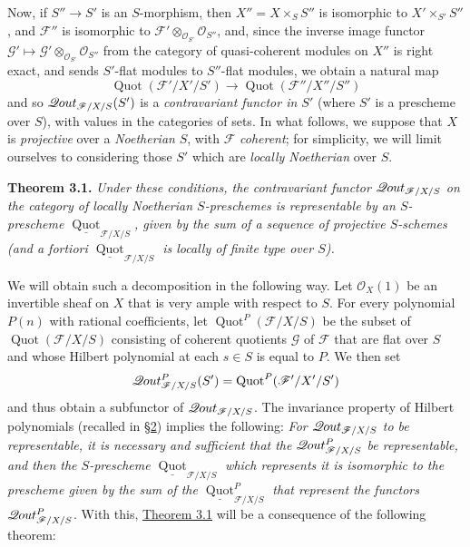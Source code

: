 \documentclass{article}
\newenvironment{itenv}[1]
  {\phantomsection\par\smallskip\noindent\textbf{#1.}\itshape}
  {\par\smallskip}
\theoremstyle{definition}
\theoremstyle{definition}
\theoremstyle{definition}
\theoremstyle{definition}
\theoremstyle{remark}
\begin{document}
Now, if \(S''\to S'\) is an \(S\)-morphism, then \(X''=X\times_S S''\) is isomorphic to \(X'\times_{S'}S''\), and \({\mathscr{F}}''\) is isomorphic to \({\mathscr{F}}'\otimes_{{\mathscr{O}}_{S'}}{\mathscr{O}}_{S''}\), and, since the inverse image functor \({\mathscr{G}}'\mapsto{\mathscr{G}}'\otimes_{{\mathscr{O}}_{S'}}{\mathscr{O}}_{S''}\) from the category of quasi-coherent modules on \(X''\) is right exact, and sends \(S'\)-flat modules to \(S''\)-flat modules, we obtain a natural map
\[
  \operatorname{Quot}({{\mathscr{F}}'/X'/S'}) \to \operatorname{Quot}({\mathscr{F}}''/X''/S'')
\]
and so \(\mathscr{Q}\kern -.5pt out_{{{\mathscr{F}}/X/S}}(S')\) is a \emph{contravariant functor in \(S'\)} (where \(S'\) is a prescheme over \(S\)), with values in the categories of sets.
In what follows, we suppose that \(X\) is \emph{projective} over a \emph{Noetherian} \(S\), with \({\mathscr{F}}\) \emph{coherent};
for simplicity, we will limit ourselves to considering those \(S'\) which are \emph{locally Noetherian} over \(S\).

\leavevmode{}%
\begin{itenv}{Theorem 3.1}
Under these conditions, the contravariant functor \(\mathscr{Q}\kern -.5pt out_{{{\mathscr{F}}/X/S}}\) on the category of locally Noetherian \(S\)-preschemes is \emph{representable} by an \(S\)-prescheme \(\underline{\operatorname{Quot}}_{{{\mathscr{F}}/X/S}}\), given by the sum of a sequence of projective \(S\)-schemes (and a fortiori \(\underline{\operatorname{Quot}}_{{{\mathscr{F}}/X/S}}\) is locally of finite type over \(S\)).

\end{itenv}

We will obtain such a decomposition in the following way.
Let \({\mathscr{O}}_X(1)\) be an invertible sheaf on \(X\) that is very ample with respect to \(S\).
For every polynomial \(P(n)\) with rational coefficients, let \(\operatorname{Quot}^P({{\mathscr{F}}/X/S})\) be the subset of \(\operatorname{Quot}({{\mathscr{F}}/X/S})\) consisting of coherent quotients \({\mathscr{G}}\) of \({\mathscr{F}}\) that are flat over \(S\) and whose Hilbert polynomial at each \(s\in S\) is equal to \(P\).
We then set
\[
  \mathscr{Q}\kern -.5pt out_{{\mathscr{F}}/X/S}^P(S') = \operatorname{Quot}^P({{\mathscr{F}}'/X'/S'})
\]
and thus obtain a subfunctor of \(\mathscr{Q}\kern -.5pt out_{{\mathscr{F}}/X/S}\).
The invariance property of Hilbert polynomials (recalled in \protect\hyperlink{fga-3-iv-section-2}{§2}) implies the following:
\emph{For \(\mathscr{Q}\kern -.5pt out_{{\mathscr{F}}/X/S}\) to be representable, it is necessary and sufficient that the \(\mathscr{Q}\kern -.5pt out_{{\mathscr{F}}/X/S}^P\) be representable, and then the \(S\)-prescheme \(\underline{\operatorname{Quot}}_{{{\mathscr{F}}/X/S}}\) which represents it is isomorphic to the prescheme given by the sum of the \(\underline{\operatorname{Quot}}_{{{\mathscr{F}}/X/S}}^P\) that represent the functors \(\mathscr{Q}\kern -.5pt out_{{\mathscr{F}}/X/S}^P\)}.
With this, \protect\hyperlink{fga-3-iv-theorem-3.1}{Theorem 3.1} will be a consequence of the following theorem:
\end{document}
